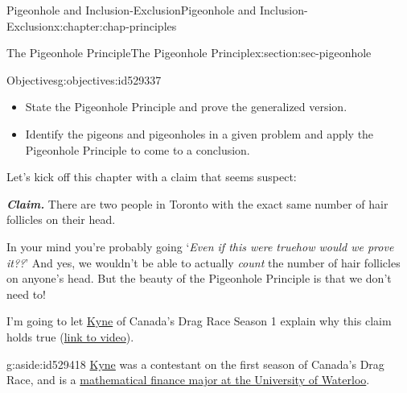 \documentclass[oneside,10pt,]{book}
\newcommand{\alert}[1]{\textbf{\textit{#1}}}
\numberwithin{equation}{section}
\newlength{\qrsize}
\newlength{\previewwidth}
\begin{document}
\begin{chapterptx}{Pigeonhole and Inclusion-Exclusion}{}{Pigeonhole and Inclusion-Exclusion}{}{}{x:chapter:chap-principles}
%
%
\typeout{************************************************}
\typeout{************************************************}
%
\begin{sectionptx}{The Pigeonhole Principle}{}{The Pigeonhole Principle}{}{}{x:section:sec-pigeonhole}
\begin{objectives}{Objectives}{g:objectives:id529337}
%
\begin{itemize}[label=\textbullet]
\item{}State the Pigeonhole Principle and prove the generalized version.%
\item{}Identify the pigeons and pigeonholes in a given problem and apply the Pigeonhole Principle to come to a conclusion.%
\end{itemize}
\end{objectives}
Let's kick off this chapter with a claim that seems suspect:%
\par
\alert{Claim.} There are two people in Toronto with the exact same number of hair follicles on their head.%
\par
In your mind you're probably going `\emph{Even if this were true\textellipsis{}how would we prove it??}' And yes, we wouldn't be able to actually \emph{count} the number of hair follicles on anyone's head. But the beauty of the Pigeonhole Principle is that we don't need to!%
\par
I'm going to let \href{https://twitter.com/onlinekyne}{Kyne} of Canada's Drag Race Season 1 explain why this claim holds true (\href{https://www.tiktok.com/@onlinekyne/video/6825323353256070406}{link to video}).%
\begin{aside}{}{g:aside:id529418}%
\href{https://www.onlinekyne.com/}{Kyne} was a contestant on the first season of Canada's Drag Race, and is a \href{https://uwaterloo.ca/stories/mathematics/university-waterloos-math-student-vying-become-canadas-first}{mathematical finance major at the University of Waterloo}.%
\end{aside}
\begin{sidebyside}{1}{0.1}{0.1}{0}%
\begin{sbspanel}{0.8}%
\setlength{\qrsize}{7.2em}
\setlength{\previewwidth}{\linewidth}
\addtolength{\previewwidth}{-\qrsize}
\begin{tcbraster}[raster columns=2, raster column skip=1pt, raster halign=center, raster force size=false, raster left skip=0pt, raster right skip=0pt]%

\end{tcbraster}
\end{sbspanel}
\end{sidebyside}
\end{sectionptx}
\end{chapterptx}
\end{document}

